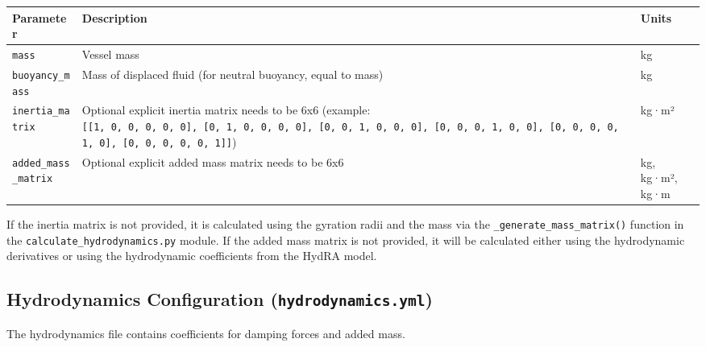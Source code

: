 \documentclass[
  letterpaper,
  DIV=11,
  numbers=noendperiod]{scrreprt}
\begin{document}
\begin{longtable}[]{@{}
  >{\raggedright\arraybackslash}p{}
  >{\raggedright\arraybackslash}p{}
  >{\raggedright\arraybackslash}p{}@{}}
\toprule\noalign{}
\begin{minipage}[b]{\linewidth}\raggedright
Parameter
\end{minipage} & \begin{minipage}[b]{\linewidth}\raggedright
Description
\end{minipage} & \begin{minipage}[b]{\linewidth}\raggedright
Units
\end{minipage} \\
\midrule\noalign{}
\endhead
\bottomrule\noalign{}
\endlastfoot
\texttt{mass} & Vessel mass & kg \\
\texttt{buoyancy\_mass} & Mass of displaced fluid (for neutral buoyancy,
equal to mass) & kg \\
\texttt{inertia\_matrix} & Optional explicit inertia matrix needs to be
6x6 (example:
\texttt{{[}{[}1,\ 0,\ 0,\ 0,\ 0,\ 0{]},\ {[}0,\ 1,\ 0,\ 0,\ 0,\ 0{]},\ {[}0,\ 0,\ 1,\ 0,\ 0,\ 0{]},\ {[}0,\ 0,\ 0,\ 1,\ 0,\ 0{]},\ {[}0,\ 0,\ 0,\ 0,\ 1,\ 0{]},\ {[}0,\ 0,\ 0,\ 0,\ 0,\ 1{]}{]}})
& kg·m² \\
\texttt{added\_mass\_matrix} & Optional explicit added mass matrix needs
to be 6x6 & kg, kg·m², kg·m \\
\end{longtable}

If the inertia matrix is not provided, it is calculated using the
gyration radii and the mass via the \texttt{\_generate\_mass\_matrix()}
function in the \texttt{calculate\_hydrodynamics.py} module. If the
added mass matrix is not provided, it will be calculated either using
the hydrodynamic derivatives or using the hydrodynamic coefficients from
the HydRA model.

\subsection*{\texorpdfstring{Hydrodynamics Configuration
(\texttt{hydrodynamics.yml})}{Hydrodynamics Configuration (hydrodynamics.yml)}}\label{hydrodynamics-configuration-hydrodynamics.yml}

The hydrodynamics file contains coefficients for damping forces and
added mass.
\end{document}
